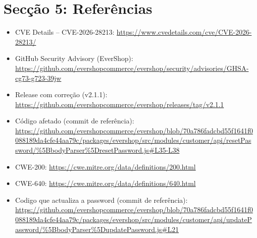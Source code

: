\documentclass[12pt,a4paper]{article}
\begin{document}
\section{Secção 5: Referências}
\begin{itemize}
		\item CVE Details -- CVE-2026-28213: \url{https://www.cvedetails.com/cve/CVE-2026-28213/}
		\item GitHub Security Advisory (EverShop): \url{https://github.com/evershopcommerce/evershop/security/advisories/GHSA-cg73-g723-39jw}
		\item Release com correção (v2.1.1): \url{https://github.com/evershopcommerce/evershop/releases/tag/v2.1.1}
		\item Código afetado (commit de referência): \url{https://github.com/evershopcommerce/evershop/blob/70a786fadcbd55f1641f0088189da4cfe44aa79c/packages/evershop/src/modules/customer/api/resetPassword/%5BbodyParser%5DresetPassword.js#L35-L38}
		\item CWE-200: \url{https://cwe.mitre.org/data/definitions/200.html}
		\item CWE-640: \url{https://cwe.mitre.org/data/definitions/640.html}
		\item Codigo que actualiza a password (commit de referência): \url{https://github.com/evershopcommerce/evershop/blob/70a786fadcbd55f1641f0088189da4cfe44aa79c/packages/evershop/src/modules/customer/api/updatePassword/%5BbodyParser%5DupdatePassword.js#L21}
\end{itemize}
\end{document}
